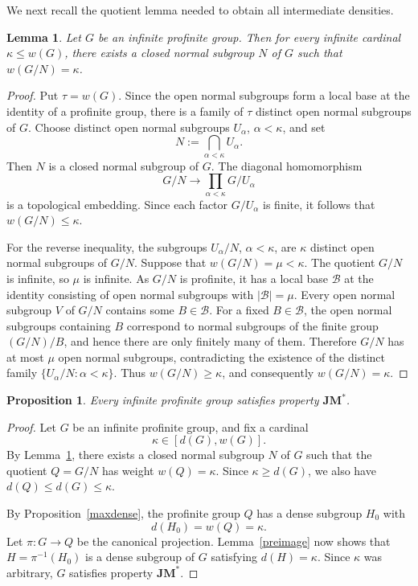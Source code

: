 \documentclass[12pt]{amsart}
\newtheorem{lemma}[theorem]{Lemma}
\newtheorem{proposition}[theorem]{Proposition}
\theoremstyle{definition}
\numberwithin{equation}{section}
\theoremstyle{remark}
\def\JM{\mathbf{JM}}
\begin{document}
We next recall the quotient lemma needed to obtain all intermediate densities.

\begin{lemma}\label{weight_quotient}
Let $G$ be an infinite profinite group. Then for every infinite cardinal $\kappa\leq w(G)$, there exists a closed normal subgroup $N$ of $G$ such that $w(G/N)=\kappa$.
\end{lemma}

\begin{proof}
Put $\tau=w(G)$. Since the open normal subgroups form a local base at the identity of a profinite group, there is a family of $\tau$ distinct open normal subgroups of $G$. Choose distinct open normal subgroups $U_\alpha$, $\alpha<\kappa$, and set
\[
N:=\bigcap_{\alpha<\kappa}U_\alpha.
\]
Then $N$ is a closed normal subgroup of $G$. The diagonal homomorphism
\[
G/N\longrightarrow \prod_{\alpha<\kappa}G/U_\alpha
\]
is a topological embedding. Since each factor $G/U_\alpha$ is finite, it follows that $w(G/N)\leq\kappa$.

For the reverse inequality, the subgroups $U_\alpha/N$, $\alpha<\kappa$, are $\kappa$ distinct open normal subgroups of $G/N$. Suppose that $w(G/N)=\mu<\kappa$. The quotient $G/N$ is infinite, so $\mu$ is infinite. As $G/N$ is profinite, it has a local base $\mathcal B$ at the identity consisting of open normal subgroups with $|\mathcal B|=\mu$. Every open normal subgroup $V$ of $G/N$ contains some $B\in\mathcal B$. For a fixed $B\in\mathcal B$, the open normal subgroups containing $B$ correspond to normal subgroups of the finite group $(G/N)/B$, and hence there are only finitely many of them. Therefore $G/N$ has at most $\mu$ open normal subgroups, contradicting the existence of the distinct family $\{U_\alpha/N:\alpha<\kappa\}$. Thus $w(G/N)\geq\kappa$, and consequently $w(G/N)=\kappa$.
\end{proof}

\begin{proposition}\label{profiniteJM}
Every infinite profinite group satisfies property $\JM^*$.
\end{proposition}

\begin{proof}
Let $G$ be an infinite profinite group, and fix a cardinal
\[
\kappa\in[d(G),w(G)].
\]
By Lemma~\ref{weight_quotient}, there exists a closed normal subgroup $N$ of $G$ such that the quotient $Q=G/N$ has weight $w(Q)=\kappa$. Since $\kappa\geq d(G)$, we also have $d(Q)\leq d(G)\leq\kappa$.

By Proposition~\ref{maxdense}, the profinite group $Q$ has a dense subgroup $H_0$ with
\[
d(H_0)=w(Q)=\kappa.
\]
Let $\pi:G\to Q$ be the canonical projection. Lemma~\ref{preimage} now shows that $H=\pi^{-1}(H_0)$ is a dense subgroup of $G$ satisfying $d(H)=\kappa$. Since $\kappa$ was arbitrary, $G$ satisfies property $\JM^*$.
\end{proof}
\end{document}
